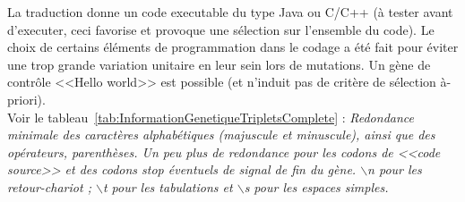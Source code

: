 \documentclass[11pt,twoside,a4paper]{article}
\begin{document}
La traduction donne un code executable du type Java ou C/C++ ({\`a} tester avant d'executer, ceci favorise et provoque une s{\'e}lection sur l'ensemble du code). Le choix de certains {\'e}l{\'e}ments de programmation dans le codage a {\'e}t{\'e} fait pour {\'e}viter une trop grande variation unitaire en leur sein lors de mutations. Un g{\`e}ne de contr{\^o}le <<Hello world>> est possible (et n'induit pas de crit{\`e}re de s{\'e}lection {\`a}-priori).~\\

Voir le tableau~\ref{tab:InformationGenetiqueTripletsComplete} : \emph{Redondance minimale des caract{\`e}res alphab{\'e}tiques (majuscule et minuscule), ainsi que des op{\'e}rateurs, parenth{\`e}ses. Un peu plus de redondance pour les codons de <<code source>> et des codons stop {\'e}ventuels de signal de fin du g{\`e}ne. $\backslash$n pour les retour-chariot ; $\backslash$t pour les tabulations et $\backslash$s pour les espaces simples. }~\\
\end{document}
